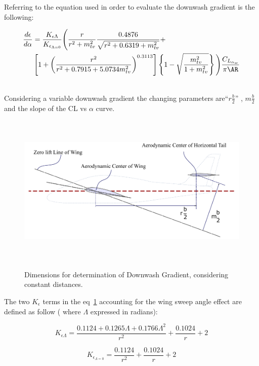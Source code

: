 Referring to \cite{Slinger} the equation used in order to evaluate the downwash gradient is the following: 

\begin{equation}
\begin{split}
 \frac{d\epsilon}{d\alpha} &= \frac{K_{\epsilon \Lambda}}{K_{\epsilon _{\Lambda=0}}}  \Biggr ( \frac{r}{r^2+m_{tv}^2} 
 \frac{0.4876}{\sqrt{r^2 + 0.6319 + m_{tv}^2}}  +\\
& \left [1+{ \left( \frac{r^2}{r^2 + 0.7915 + 5.0734 m_{tv}^2} \right) }^{0.3113}  \right ]    \left \{ 1- \sqrt{\frac{m_{tv}^2}{1+m_{tv}^2}} \right \}      \Biggl )    \frac{C_{L_{{\alpha}_w}}}{\pi \AR}
\end{split}
\end{equation}

\noindent \\
Considering a variable downwash gradient the changing parameters are``$r \frac{b}{2}$'' , $m \frac{b}{2}$ and the slope of the CL vs $\alpha$ curve.

\begin{figure}[H]
\centering
{\includegraphics[height=7.3cm]{Immagini/wing_htail_Roskam_eng.pdf}} 
\caption{Dimensions for determination of Downwash Gradient, considering constant distances.}
\label{PerkinsDownwash}
\end{figure} 

The two $K_{\epsilon}$ terms in the eq~\ref{PerkinsDownwash} accounting for the wing sweep angle effect are defined as follow ( where $\Lambda $ expressed in radians):

\begin{equation}
K_{\epsilon \Lambda} = \frac{ 0.1124 + 0.1265 \Lambda + 0.1766 \Lambda^2}{r^2} + \frac{0.1024}{r} +2
\end{equation}

\begin{equation}
K_{\epsilon _{\Lambda=0}} = \frac{ 0.1124 }{r^2} + \frac{0.1024}{r} +2
\end{equation}

